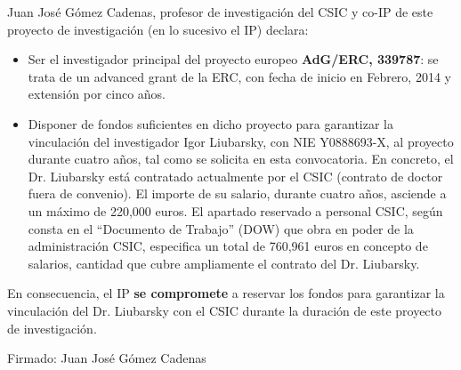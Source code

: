 \documentclass[a4paper,11pt,oneside]{article}
\begin{document}


%

Juan José Gómez Cadenas, profesor de investigación del CSIC y co-IP de este proyecto de investigación (en lo sucesivo el IP) declara: 

\begin{itemize}

\item Ser el investigador principal del proyecto europeo {\bf AdG/ERC, 339787}: se trata de un advanced grant de la ERC, con fecha de inicio en Febrero, 2014 y extensión por cinco años.  
% 
\item Disponer de fondos suficientes en dicho proyecto para garantizar la vinculación del investigador Igor Liubarsky, con NIE Y0888693-X, al proyecto durante cuatro años, tal como se solicita en esta convocatoria.  En concreto, el Dr. Liubarsky está contratado actualmente por el CSIC (contrato de doctor fuera de convenio). El importe de su salario, durante cuatro años, asciende a un máximo de 220,000 euros. El apartado reservado a personal CSIC, según consta en el ``Documento de Trabajo'' (DOW) que obra en poder de la administración CSIC, especifica un total de 760,961 euros en concepto de salarios, cantidad que cubre ampliamente el contrato del Dr. Liubarsky.
\end{itemize}
%

En consecuencia, el IP {\bf se compromete} a reservar los fondos para garantizar la   vinculación del Dr. Liubarsky con el CSIC durante la duración de este proyecto de investigación. 


Firmado: Juan José Gómez Cadenas
\end{document}

